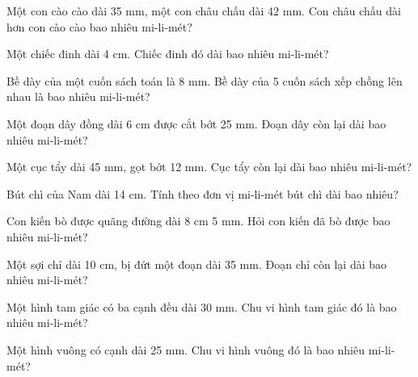 \begin{ex}
Một con cào cào dài 35 mm, một con châu chấu dài 42 mm. Con châu chấu dài hơn con cào cào bao nhiêu mi-li-mét?
\end{ex}

\begin{ex}
Một chiếc đinh dài 4 cm. Chiếc đinh đó dài bao nhiêu mi-li-mét?
\end{ex}

\begin{ex}
Bề dày của một cuốn sách toán là 8 mm. Bề dày của 5 cuốn sách xếp chồng lên nhau là bao nhiêu mi-li-mét?
\end{ex}

\begin{ex}
Một đoạn dây đồng dài 6 cm được cắt bớt 25 mm. Đoạn dây còn lại dài bao nhiêu mi-li-mét?
\end{ex}

\begin{ex}
Một cục tẩy dài 45 mm, gọt bớt 12 mm. Cục tẩy còn lại dài bao nhiêu mi-li-mét?
\end{ex}

\begin{ex}
Bút chì của Nam dài 14 cm. Tính theo đơn vị mi-li-mét bút chì dài bao nhiêu?
\end{ex}

\begin{ex}
Con kiến bò được quãng đường dài 8 cm 5 mm. Hỏi con kiến đã bò được bao nhiêu mi-li-mét?
\end{ex}

\begin{ex}
Một sợi chỉ dài 10 cm, bị đứt một đoạn dài 35 mm. Đoạn chỉ còn lại dài bao nhiêu mi-li-mét?
\end{ex}

\begin{ex}
Một hình tam giác có ba cạnh đều dài 30 mm. Chu vi hình tam giác đó là bao nhiêu mi-li-mét?
\end{ex}

\begin{ex}
Một hình vuông có cạnh dài 25 mm. Chu vi hình vuông đó là bao nhiêu mi-li-mét?
\end{ex}

